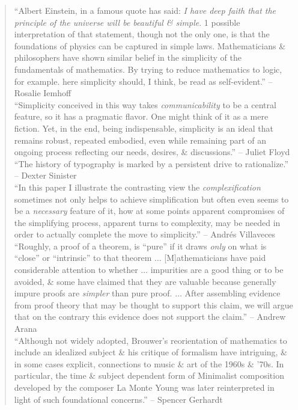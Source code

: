 \documentclass[oneside]{book}
\numberwithin{equation}{section}
\begin{document}
\begin{quotation}
	``Albert Einstein, in a famous quote has said: \textit{I have deep faith that the principle of the universe will be beautiful \& simple}. 1 possible interpretation of that statement, though not the only one, is that the foundations of physics can be captured in simple laws. Mathematicians \& philosophers have shown similar belief in the simplicity of the fundamentals of mathematics. By trying to reduce mathematics to logic, for example. here simplicity should, I think, be read as self-evident.'' -- Rosalie Iemhoff\\
	
	``Simplicity conceived in this way takes \textit{communicability} to be a central feature, so it has a pragmatic flavor. One might think of it as a mere fiction. Yet, in the end, being indispensable, simplicity is an ideal that remains robust, repeated embodied, even while remaining part of an ongoing process reflecting our needs, desires, \& discussions.'' -- Juliet Floyd\\
	
	``The history of typography is marked by a persistent drive to rationalize.'' -- Dexter Sinister\\
	
	``In this paper I illustrate the contrasting view the \textit{complexification} sometimes not only helps to achieve simplification but often even seems to be a \textit{necessary} feature of it, how at some points apparent compromises of the simplifying process, apparent turns to complexity, may be needed in order to actually complete the move to simplicity.'' -- Andr\'es Villaveces\\
	
	``Roughly, a proof of a theorem, is ``pure'' if it draws \textit{only} on what is ``close'' or ``intrinsic'' to that theorem $\ldots$ [M]athematicians have paid considerable attention to whether $\ldots$ impurities are a good thing or to be avoided, \& some have claimed that they are valuable because generally impure proofs are \textit{simpler} than pure proof. $\ldots$ After assembling evidence from proof theory that may be thought to support this claim, we will argue that on the contrary this evidence does not support the claim.'' -- Andrew Arana\\
	
	``Although not widely adopted, Brouwer's reorientation of mathematics to include an idealized subject \& his critique of formalism have intriguing, \& in some cases explicit, connections to music \& art of the 1960s \& '70s. In particular, the time \& subject dependent form of Minimalist composition developed by the composer La Monte Young was later reinterpreted in light of such foundational concerns.'' -- Spencer Gerhardt\\
	

\end{quotation}
\end{document}
